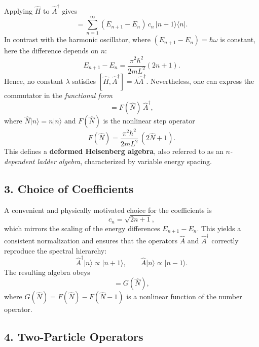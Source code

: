 Applying $\hat{H}$ to $\hat{A}^\dagger$ gives
\begin{equation}
    [\hat{H}, \hat{A}^\dagger] = \sum_{n=1}^{\infty} (E_{n+1} - E_n)\,c_n\,|n+1\rangle\langle n|.
\end{equation}
In contrast with the harmonic oscillator, where $(E_{n+1}-E_n) = \hbar\omega$ is constant, here the difference depends on $n$:
\begin{equation}
    E_{n+1} - E_n = \frac{\pi^2\hbar^2}{2mL^2}(2n+1).
\end{equation}
Hence, no constant $\lambda$ satisfies $[\hat{H},\hat{A}^\dagger] = \lambda \hat{A}^\dagger$.  
Nevertheless, one can express the commutator in the \emph{functional form}
\begin{equation}
    [\hat{H},\hat{A}^\dagger] = F(\hat{N})\,\hat{A}^\dagger,
\end{equation}
where $\hat{N}|n\rangle = n|n\rangle$ and $F(\hat{N})$ is the nonlinear step operator
\[
F(\hat{N}) = \frac{\pi^2\hbar^2}{2mL^2}\,(2\hat{N}+1).
\]
This defines a \textbf{deformed Heisenberg algebra}, also referred to as an \emph{$n$-dependent ladder algebra}, characterized by variable energy spacing.

\subsection*{3. Choice of Coefficients}

A convenient and physically motivated choice for the coefficients is
\begin{equation}
    c_n = \sqrt{2n+1},
\end{equation}
which mirrors the scaling of the energy differences $E_{n+1}-E_n$.  
This yields a consistent normalization and ensures that the operators $\hat{A}$ and $\hat{A}^\dagger$ correctly reproduce the spectral hierarchy:
\[
\hat{A}^\dagger |n\rangle \propto |n+1\rangle, \qquad \hat{A} |n\rangle \propto |n-1\rangle.
\]
The resulting algebra obeys
\begin{equation}
    [\hat{A}, \hat{A}^\dagger] = G(\hat{N}),
\end{equation}
where $G(\hat{N}) = F(\hat{N}) - F(\hat{N}-1)$ is a nonlinear function of the number operator.

\subsection*{4. Two-Particle Operators}

